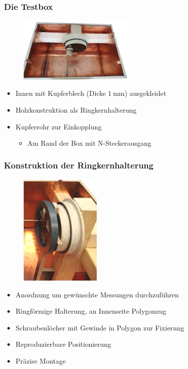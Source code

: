 \documentclass[accentcolor=tud9b, colorbacktitle, inverttitle]{tudbeamer}
\begin{document}
\begin{frame}\frametitle{Die Testbox}
\vspace{-1em}
\begin{multicols}{2}
	\begin{figure}[h]
		\centering
		\includegraphics[width=0.5\textwidth]{boxleer}
	\end{figure}
	\vfill\null
	\columnbreak
	\begin{itemize}
		\item Innen mit Kupferblech (Dicke $\SI{1}{\milli\meter}$) ausgekleidet
		\item Holzkonstruktion als Ringkernhalterung
		\item Kupferrohr zur Einkopplung
		\begin{itemize}
			\item Am Rand der Box mit N-Steckerausgang 
		\end{itemize}
	\end{itemize}
\end{multicols}
\end{frame}


\begin{frame}\frametitle{Konstruktion der Ringkernhalterung}
\vspace{-1em}
\begin{multicols}{2}
	\begin{figure}[h]
		\centering
		\includegraphics[width=0.35\textwidth]{BoxKreuzPolygonpraes}
	\end{figure}
	\vfill\null
	\columnbreak
	\begin{itemize}
		\item Anordnung um gew\"unschte Messungen durchzuf\"uhren
		\item Ringf\"ormige Halterung, an Innenseite Polygonzug
		\item Schraubenl\"ocher mit Gewinde in Polygon zur Fixierung
		\item Reproduzierbare Positionierung
		\item Pr\"azise Montage
	\end{itemize}
\end{multicols}
\end{frame}
\end{document}

